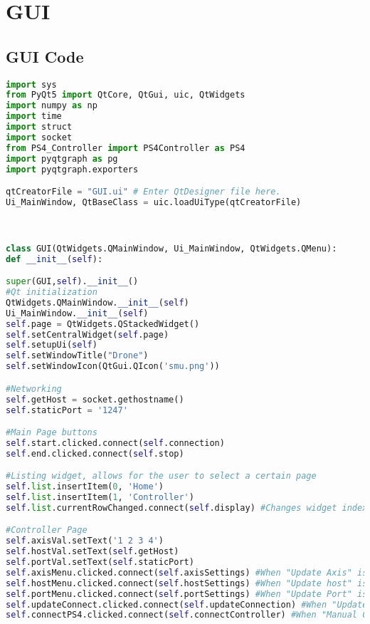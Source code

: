 \section{GUI}
\subsection{GUI Code}
\label{appendix:GUICode}
\lstset{basicstyle=\tiny}
\begin{lstlisting}[language=Python,caption={GUI.py},label={lst:GUI.py}]
import sys
from PyQt5 import QtCore, QtGui, uic, QtWidgets
import numpy as np
import time
import struct
import socket
from PS4_Controller import PS4Controller as PS4
import pyqtgraph as pg
import pyqtgraph.exporters

qtCreatorFile = "GUI.ui" # Enter QtDesigner file here.
Ui_MainWindow, QtBaseClass = uic.loadUiType(qtCreatorFile)



class GUI(QtWidgets.QMainWindow, Ui_MainWindow, QtWidgets.QMenu):   
def __init__(self):

super(GUI,self).__init__()
#Qt initialization
QtWidgets.QMainWindow.__init__(self)
Ui_MainWindow.__init__(self)
self.page = QtWidgets.QStackedWidget()
self.setCentralWidget(self.page)
self.setupUi(self)
self.setWindowTitle("Drone")
self.setWindowIcon(QtGui.QIcon('smu.png'))

#Networking
self.getHost = socket.gethostname()
self.staticPort = '1247'

#Main Page buttons
self.start.clicked.connect(self.connection)
self.end.clicked.connect(self.stop)

#Listing widget, allows for the user to select a certain page
self.list.insertItem(0, 'Home')
self.list.insertItem(1, 'Controller')
self.list.currentRowChanged.connect(self.display) #Changes widget index to appropriate page

#Controller Page
self.axisVal.setText('1 2 3 4')
self.hostVal.setText(self.getHost)
self.portVal.setText(self.staticPort)
self.axisMenu.clicked.connect(self.axisSettings) #When "Update Axis" is clicked call definition axisSettings
self.hostMenu.clicked.connect(self.hostSettings) #When "Update host" is clicked call definition hostSettings
self.portMenu.clicked.connect(self.portSettings) #When "Update Port" is clicked call definition portSettings
self.updateConnect.clicked.connect(self.updateConnection) #When "Update Connection" is clicked call definition updateConnection
self.connectPS4.clicked.connect(self.connectController) #When "Manual Control" is clicked call definition connectController


\end{lstlisting}
